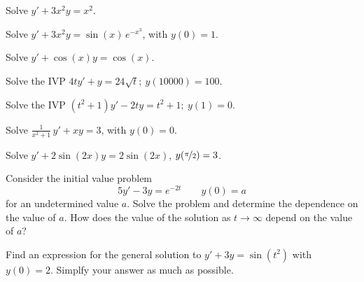 \documentclass{ximera}
\begin{document}
\begin{exercise}%
    Solve $y'+3 x^2 y = x^2$.
\end{exercise}

\begin{exercise}
    Solve $y' + 3x^2y = \sin(x) \, e^{-x^3}$, with $y(0) = 1$.
\end{exercise}

\begin{exercise}
    Solve $y' + \cos (x) y = \cos(x)$.
\end{exercise}

\begin{exercise}
    Solve the IVP $4ty'+y=24\sqrt{t};\ y(10000)=100.$ %
\end{exercise}

\begin{exercise}
    Solve the IVP $(t^2+1)y' - 2ty = t^2+1; \ y(1)=0$. %
\end{exercise}

\begin{exercise}
    Solve $\frac{1}{x^2+1} \, y' + x y = 3$, with $y(0) = 0$.
\end{exercise}

\begin{exercise}%
    Solve $y'+ 2\sin(2x) y = 2\sin(2x)$, $y(\nicefrac{\pi}{2}) = 3$.
\end{exercise}

\begin{exercise}
    Consider the initial value problem
    \[ 
        5y' - 3y = e^{-2t} \qquad y(0) = a 
    \] 
    for an undetermined value $a$. Solve the problem and determine the dependence on the value of $a$. How does the value of the solution as $t \rightarrow \infty$ depend on the value of $a$?
\end{exercise}

\begin{exercise}
    Find an expression for the general solution to $y' + 3y = \sin(t^2)$ with $y(0) = 2$. Simplfy your answer as much as possible. 
\end{exercise}

\end{document}
